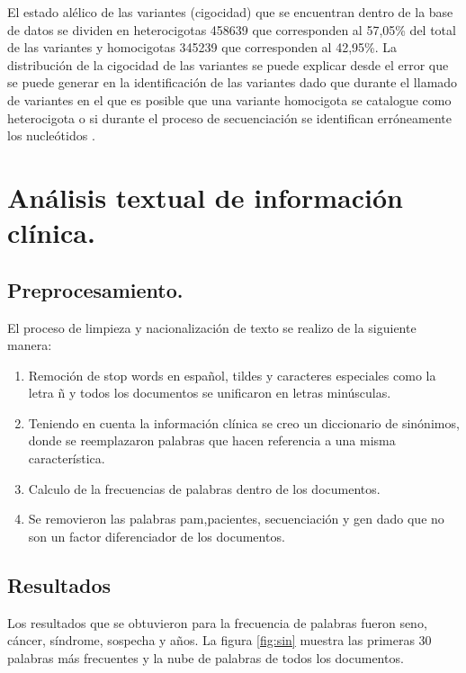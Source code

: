 El estado alélico de las variantes (cigocidad) que se encuentran dentro de la base de datos se dividen en heterocigotas 458639 que corresponden al 57,05\% del total de las variantes  y homocigotas 345239 que corresponden al 42,95\%. La distribución de la cigocidad de las variantes se puede explicar desde el error que se puede generar en la identificación de las variantes dado que durante el llamado  de variantes en el que es posible que una variante homocigota se catalogue como heterocigota o si durante el proceso de secuenciación se identifican erróneamente los nucleótidos \cite{Babraham2016}\cite{Pirooznia2014}. 


\section{Análisis textual de información clínica.}

 
\subsection{Preprocesamiento.}

El proceso de limpieza y nacionalización de texto se realizo de la siguiente manera:

 \begin{enumerate}
 	\item Remoción de stop words en español, tildes y caracteres especiales como  la letra ñ y todos los documentos se unificaron en letras minúsculas.
 	\item Teniendo en cuenta la información clínica se creo un diccionario de sinónimos, donde se reemplazaron palabras que hacen referencia a una misma característica.
 	\item Calculo de la frecuencias de palabras dentro de los documentos. 
 	\item Se removieron las palabras pam,pacientes, secuenciación y gen dado que no son un factor diferenciador de los documentos.  	  
 \end{enumerate}

\subsection*{Resultados}

Los resultados que se obtuvieron para la frecuencia de palabras fueron seno, cáncer, síndrome, sospecha y años. La figura \ref{fig:sin} muestra las primeras 30 palabras más frecuentes y la nube de palabras de todos los documentos.\\

